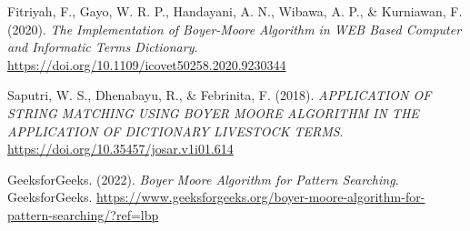 \begin{thebibliography}{30}
    Fitriyah, F., Gayo, W. R. P., Handayani, A. N., Wibawa, A. P., \& Kurniawan, F. (2020).
    \emph{The Implementation of Boyer-Moore Algorithm in WEB Based Computer and Informatic Terms
    Dictionary}. \href{https://doi.org/10.1109/icovet50258.2020.9230344}{https://doi.org/10.1109/icovet50258.2020.9230344}

    Saputri, W. S., Dhenabayu, R., \& Febrinita, F. (2018). \emph{APPLICATION OF STRING MATCHING
    USING BOYER MOORE ALGORITHM IN THE APPLICATION OF DICTIONARY LIVESTOCK TERMS}.
    \href{https://doi.org/10.35457/josar.v1i01.614}{https://doi.org/10.35457/josar.v1i01.614}

    GeeksforGeeks. (2022). \emph{Boyer Moore Algorithm for Pattern Searching}. GeeksforGeeks.
    \href{https://www.geeksforgeeks.org/boyer-moore-algorithm-for-pattern-searching/?ref=lbp}{https://www.geeksforgeeks.org/boyer-moore-algorithm-for-pattern-searching/?ref=lbp}

\end{thebibliography}

